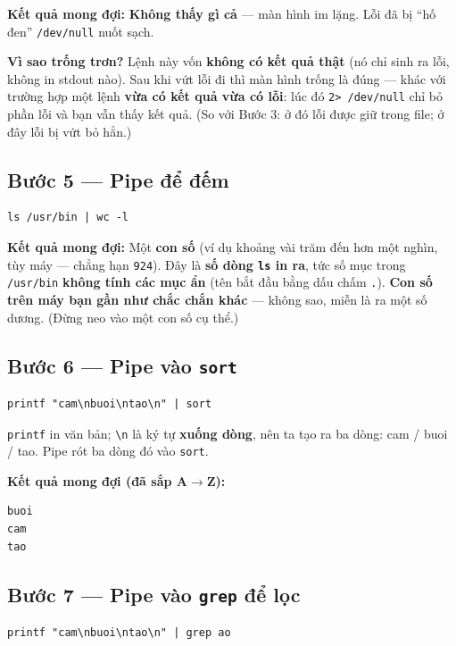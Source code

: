 \documentclass[12pt,a4paper]{article}
\newcommand{\cmd}[1]{\texttt{#1}}
\begin{document}
\textbf{Kết quả mong đợi:} \textbf{Không thấy gì cả} --- màn hình im lặng. Lỗi đã bị ``hố đen'' \cmd{/dev/null} nuốt sạch.

\textbf{Vì sao trống trơn?} Lệnh này vốn \textbf{không có kết quả thật} (nó chỉ sinh ra lỗi, không in stdout nào). Sau khi vứt lỗi đi thì màn hình trống là đúng --- khác với trường hợp một lệnh \textbf{vừa có kết quả vừa có lỗi}: lúc đó \cmd{2> /dev/null} chỉ bỏ phần lỗi và bạn vẫn thấy kết quả. (So với Bước 3: ở đó lỗi được giữ trong file; ở đây lỗi bị vứt bỏ hẳn.)

\subsection{Bước 5 --- Pipe để đếm}

\begin{Verbatim}
ls /usr/bin | wc -l
\end{Verbatim}

\textbf{Kết quả mong đợi:} Một \textbf{con số} (ví dụ khoảng vài trăm đến hơn một nghìn, tùy máy --- chẳng hạn \cmd{924}). Đây là \textbf{số dòng \cmd{ls} in ra}, tức số mục trong \cmd{/usr/bin} \textbf{không tính các mục ẩn} (tên bắt đầu bằng dấu chấm \cmd{.}). \textbf{Con số trên máy bạn gần như chắc chắn khác} --- không sao, miễn là ra một số dương. (Đừng neo vào một con số cụ thể.)

\subsection{Bước 6 --- Pipe vào \texttt{sort}}

\begin{Verbatim}
printf "cam\nbuoi\ntao\n" | sort
\end{Verbatim}

\cmd{printf} in văn bản; \cmd{\textbackslash n} là ký tự \textbf{xuống dòng}, nên ta tạo ra ba dòng: cam / buoi / tao. Pipe rót ba dòng đó vào \cmd{sort}.

\textbf{Kết quả mong đợi (đã sắp A$\rightarrow$Z):}
\begin{Verbatim}
buoi
cam
tao
\end{Verbatim}

\subsection{Bước 7 --- Pipe vào \texttt{grep} để lọc}

\begin{Verbatim}
printf "cam\nbuoi\ntao\n" | grep ao
\end{Verbatim}
\end{document}
